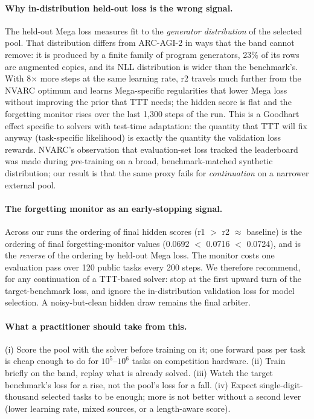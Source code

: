 \documentclass[11pt]{article}
\newcommand{\nvarc}{NVARC}
\begin{document}
\paragraph{Why in-distribution held-out loss is the wrong signal.}
The held-out Mega loss measures fit to the \emph{generator distribution} of the selected pool. That distribution differs from ARC-AGI-2 in ways that the band cannot remove: it is produced by a finite family of program generators, 23\% of its rows are augmented copies, and its NLL distribution is wider than the benchmark's. With 8$\times$ more steps at the same learning rate, r2 travels much further from the \nvarc{} optimum and learns Mega-specific regularities that lower Mega loss without improving the prior that TTT needs; the hidden score is flat and the forgetting monitor rises over the last 1{,}300 steps of the run. This is a Goodhart effect specific to solvers with test-time adaptation: the quantity that TTT will fix anyway (task-specific likelihood) is exactly the quantity the validation loss rewards. \nvarc{}'s observation that evaluation-set loss tracked the leaderboard was made during \emph{pre}-training on a broad, benchmark-matched synthetic distribution; our result is that the same proxy fails for \emph{continuation} on a narrower external pool.

\paragraph{The forgetting monitor as an early-stopping signal.}
Across our runs the ordering of final hidden scores (r1 $>$ r2 $\approx$ baseline) is the ordering of final forgetting-monitor values (0.0692 $<$ 0.0716 $<$ 0.0724), and is the \emph{reverse} of the ordering by held-out Mega loss. The monitor costs one evaluation pass over 120 public tasks every 200 steps. We therefore recommend, for any continuation of a TTT-based solver: stop at the first upward turn of the target-benchmark loss, and ignore the in-distribution validation loss for model selection. A noisy-but-clean hidden draw remains the final arbiter.

\paragraph{What a practitioner should take from this.}
(i) Score the pool with the solver before training on it; one forward pass per task is cheap enough to do for $10^5$--$10^6$ tasks on competition hardware. (ii) Train briefly on the band, replay what is already solved. (iii) Watch the target benchmark's loss for a rise, not the pool's loss for a fall. (iv) Expect single-digit-thousand selected tasks to be enough; more is not better without a second lever (lower learning rate, mixed sources, or a length-aware score).
\end{document}
